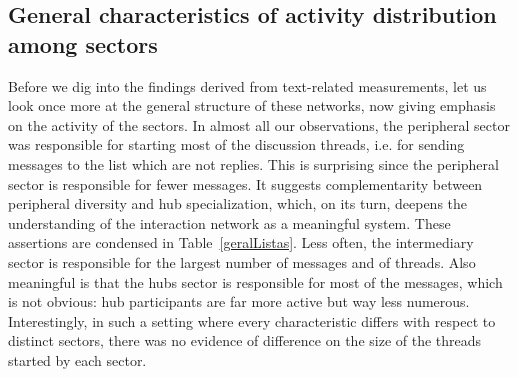 \subsection{General characteristics of activity distribution among sectors}\label{sec:gen}
Before we dig into the findings derived from text-related measurements,
let us look once more at the general structure of these networks,
now giving emphasis on the activity of the sectors.
In almost all our observations,
the peripheral sector was responsible for starting most of the discussion threads,
i.e. for sending messages to the list which are not replies.
This is surprising since the peripheral sector is responsible for fewer messages. It suggests complementarity between peripheral diversity and hub specialization, which, on its turn, deepens the understanding of the interaction network as a meaningful system. 
These assertions are condensed in Table~\ref{geralListas}.
Less often, the intermediary sector is responsible for the largest number of messages and of threads.
Also meaningful is that the hubs sector is responsible for most of the messages, which is not obvious: hub participants are far more active but way less numerous. Interestingly, in such a setting where every characteristic differs with respect to
distinct sectors, there was no evidence of difference on the size of the threads started by each sector.



